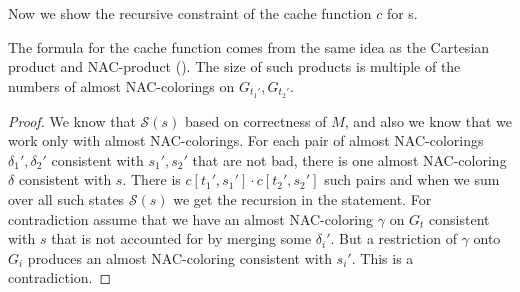 Now we show the recursive constraint of the cache function \( c \) for \JoinNode{}s.
%
%
The formula for the cache function comes from
the same idea as the Cartesian product and
NAC-product ().
The size of such products is multiple of the numbers of
almost NAC-colorings on \( G_{t_1'}, G_{t_2'} \).
%
\begin{proof}
	We know that \( \mathcal{S}(s) \) based on correctness of \( M \),
	and also we know that we work only with almost NAC-colorings.
	For each pair of almost NAC-colorings \( \delta_1', \delta_2' \)
	consistent with \( s_1', s_2' \) that are not bad,
	there is one almost NAC-coloring \( \delta \) consistent with \( s \).
	There is \( c[t_1', s_1'] \cdot c[t_2', s_2'] \) such pairs and
	when we sum over all such states \( \mathcal{S}(s) \)
	we get the recursion in the statement.
	For contradiction assume that we have
	an almost NAC-coloring \( \gamma \) on \( G_t \) consistent with \( s \)
	that is not accounted for by merging some \( \delta_i' \).
	But a restriction of \( \gamma \) onto \( G_i \) produces an almost NAC-coloring
	consistent with \( s_i' \). This is a contradiction.
\end{proof}
%

